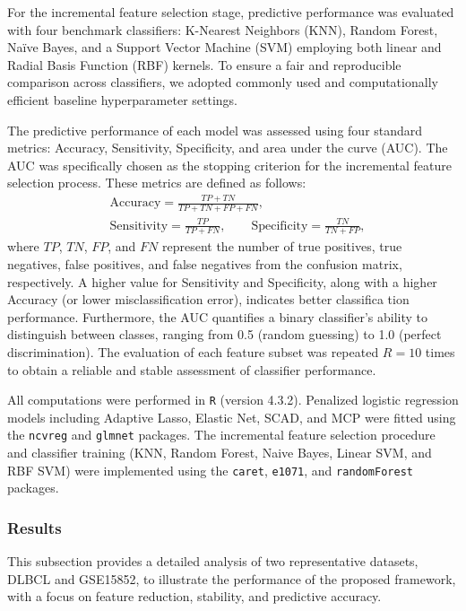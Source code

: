 \documentclass[twoside]{article}
\begin{document}
{ For the incremental feature selection stage, predictive performance was evaluated with four benchmark classifiers: K-Nearest Neighbors (KNN), Random Forest, Na\"ive Bayes, and a Support Vector Machine (SVM) employing both linear and Radial Basis Function (RBF) kernels. To ensure a fair and reproducible comparison across classifiers, we adopted commonly used and computationally efficient baseline hyperparameter settings. 
	
	The predictive performance of each model was assessed using four standard metrics: Accuracy, Sensitivity, Specificity, and area under the curve (AUC). The AUC was specifically chosen as the stopping criterion for the incremental feature selection process. These metrics are defined as follows:
	\begin{align*}
	&\text{Accuracy} = \frac{TP + TN}{TP + TN + FP + FN},\\
	&\text{Sensitivity} = \frac{TP}{TP + FN}, \qquad
	\text{Specificity} = \frac{TN}{TN + FP}, 
	\end{align*}
	where $ TP $, $ TN $, $ FP $, and $ FN $ represent the number of true positives, true negatives, false positives, and false negatives from the confusion matrix, respectively. A higher value for Sensitivity and Specificity, along with a higher Accuracy (or lower misclassification error), indicates better classifica  tion performance. Furthermore, the AUC quantifies a binary classifier's ability to distinguish between classes, ranging from 0.5 (random guessing) to 1.0 (perfect discrimination). The evaluation of each feature subset was repeated $R = 10$ times to obtain a reliable and stable assessment of classifier performance. 
	
	
	All computations were performed in \verb|R| (version 4.3.2). 
	Penalized logistic regression models including Adaptive Lasso, Elastic Net, SCAD, and MCP were fitted using the \verb|ncvreg| and \verb|glmnet| packages. The incremental feature selection procedure and classifier training (KNN, Random Forest, Naive Bayes, Linear SVM, and RBF SVM) were implemented using the \verb|caret|, \verb|e1071|, and \verb|randomForest| packages.
	
}

\subsubsection{Results}

This subsection provides a detailed analysis of two representative datasets, DLBCL and GSE15852, to illustrate the performance of the proposed framework, with a focus on feature reduction, stability, and predictive accuracy. \\
\end{document}
